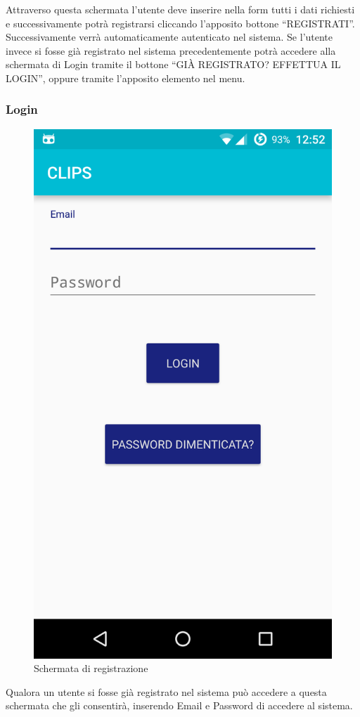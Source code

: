 Attraverso questa schermata l'utente deve inserire nella form tutti i dati richiesti e successivamente potrà registrarsi cliccando l'apposito bottone ``REGISTRATI''. Successivamente verrà automaticamente autenticato nel sistema.
Se l'utente invece si fosse già registrato nel sistema precedentemente potrà accedere alla schermata di Login tramite il bottone ``GIÀ REGISTRATO? EFFETTUA IL LOGIN'', oppure tramite l'apposito elemento nel menu.
\newpage

\subsubsection{Login}
\begin{figure}[!h]
	\centering
	\includegraphics[scale=0.15]{screenshot/login}
	\caption{Schermata di registrazione}
\end{figure}
Qualora un utente si fosse già registrato nel sistema può accedere a questa schermata che gli consentirà, inserendo Email e Password di accedere al sistema.
\newpage


